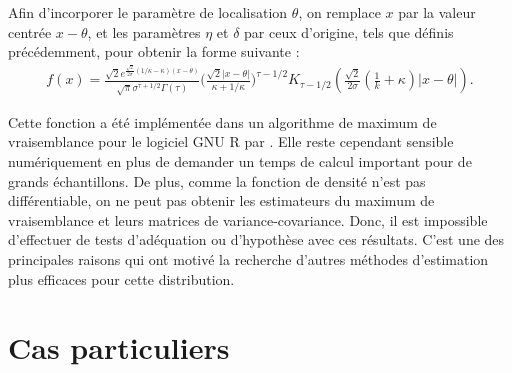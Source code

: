 Afin d'incorporer le paramètre de localisation $\theta$, on remplace
$x$ par la valeur centrée $x-\theta$, et les paramètres $\eta$ et
$\delta$ par ceux d'origine, tels que définis précédemment, pour
obtenir la forme suivante \citep{kotz2001laplace}:
\begin{align}
  \label{eq:densitekotz2001}
  f(x) =
  \frac{\sqrt{2}e^{\frac{\sqrt{2}}{2\sigma}(1/\kappa-\kappa)(x-\theta)}}{\sqrt{\pi}\sigma^{\tau+1/2}\Gamma(\tau)}
  \bigg(\frac{\sqrt{2}|x-\theta|}{\kappa+1/\kappa} \bigg)^{\tau-1/2}
  K_{\tau-1/2}\left(\frac{\sqrt{2}}{2\sigma}\left(\frac{1}{k}+\kappa
    \right)|x-\theta| \right).
\end{align}

Cette fonction a été implémentée dans un algorithme de maximum de
vraisemblance pour le logiciel GNU R par
\cite{RpackageVarianceGamma}. Elle reste cependant sensible
numériquement en plus de demander un temps de calcul important pour de
grands échantillons. De plus, comme la fonction de densité n'est pas
différentiable, on ne peut pas obtenir les estimateurs du maximum de
vraisemblance et leurs matrices de variance-covariance. Donc,
il est impossible d'effectuer de tests d'adéquation ou d'hypothèse avec ces
résultats. C'est une des principales raisons qui ont motivé la
recherche d'autres méthodes d'estimation plus efficaces pour cette
distribution.

\section{Cas particuliers}
\label{sec:cas-particuliers}

